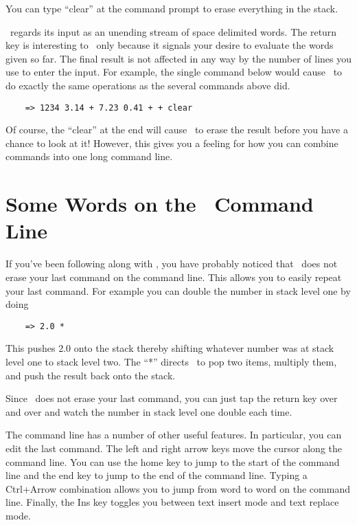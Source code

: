 You can type ``clear'' at the command prompt to erase everything in the stack.

\CLAC\ regards its input as an unending stream of space delimited words. The return key is
interesting to \CLAC\ only because it signals your desire to evaluate the words given so far.
The final result is not affected in any way by the number of lines you use to enter the input.
For example, the single command below would cause \CLAC\ to do exactly the same operations as
the several commands above did.

\begin{verbatim}
    => 1234 3.14 + 7.23 0.41 + + clear
\end{verbatim}

Of course, the ``clear'' at the end will cause \CLAC\ to erase the result before you have a
chance to look at it! However, this gives you a feeling for how you can combine commands into
one long command line.

\section{Some Words on the \CLAC\ Command Line}


If you've been following along with \CLAC, you have probably noticed that \CLAC\ does not erase
your last command on the command line. This allows you to easily repeat your last command. For
example you can double the number in stack level one by doing

\begin{verbatim}
    => 2.0 *
\end{verbatim}

This pushes 2.0 onto the stack thereby shifting whatever number was at stack level one to stack
level two. The ``*'' directs \CLAC\ to pop two items, multiply them, and push the result back
onto the stack.

Since \CLAC\ does not erase your last command, you can just tap the return key over and over and
watch the number in stack level one double each time.

The command line has a number of other useful features. In particular, you can edit the last
command. The left and right arrow keys move the cursor along the command line. You can use the
home key to jump to the start of the command line and the end key to jump to the end of the
command line. Typing a Ctrl+Arrow combination allows you to jump from word to word on the
command line. Finally, the Ins key toggles you between text insert mode and text replace mode.

